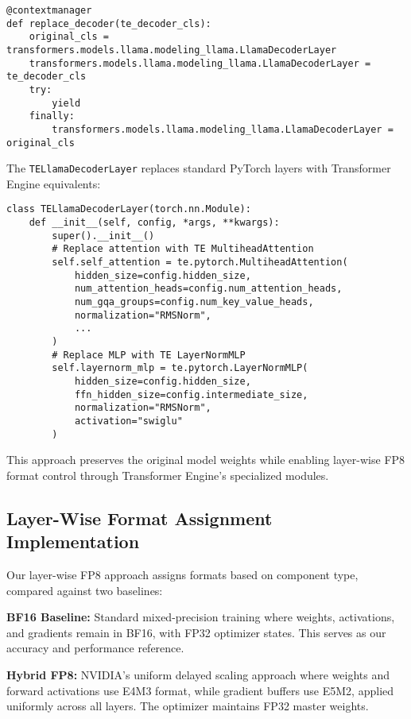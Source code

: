 \begin{verbatim}
@contextmanager
def replace_decoder(te_decoder_cls):
    original_cls = transformers.models.llama.modeling_llama.LlamaDecoderLayer
    transformers.models.llama.modeling_llama.LlamaDecoderLayer = te_decoder_cls
    try:
        yield
    finally:
        transformers.models.llama.modeling_llama.LlamaDecoderLayer = original_cls
\end{verbatim}

The \texttt{TELlamaDecoderLayer} replaces standard PyTorch layers with Transformer Engine equivalents:

\begin{verbatim}
class TELlamaDecoderLayer(torch.nn.Module):
    def __init__(self, config, *args, **kwargs):
        super().__init__()
        # Replace attention with TE MultiheadAttention
        self.self_attention = te.pytorch.MultiheadAttention(
            hidden_size=config.hidden_size,
            num_attention_heads=config.num_attention_heads,
            num_gqa_groups=config.num_key_value_heads,
            normalization="RMSNorm",
            ...
        )
        # Replace MLP with TE LayerNormMLP
        self.layernorm_mlp = te.pytorch.LayerNormMLP(
            hidden_size=config.hidden_size,
            ffn_hidden_size=config.intermediate_size,
            normalization="RMSNorm",
            activation="swiglu"
        )
\end{verbatim}

This approach preserves the original model weights while enabling layer-wise FP8 format control through Transformer Engine's specialized modules.

\subsection{Layer-Wise Format Assignment Implementation}\label{sec:precision_recipes}

Our layer-wise FP8 approach assigns formats based on component type, compared against two baselines:

\textbf{BF16 Baseline:}
Standard mixed-precision training where weights, activations, and gradients remain in BF16, with FP32 optimizer states. This serves as our accuracy and performance reference.

\textbf{Hybrid FP8:}
NVIDIA's uniform delayed scaling approach where weights and forward activations use E4M3 format, while gradient buffers use E5M2, applied uniformly across all layers. The optimizer maintains FP32 master weights.

